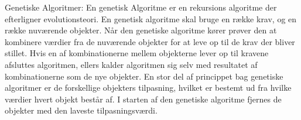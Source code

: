 Genetiske Algoritmer:
En genetisk Algoritme er en rekursions algoritme der efterligner evolutionsteori. En genetisk algoritme skal bruge en række krav, og en række nuværende objekter.
Når den genetiske algoritme kører prøver den at kombinere værdier fra de nuværende objekter for at leve op til de krav der bliver stillet. Hvis en af kombinationerne mellem objekterne lever op til kravene afsluttes algoritmen, ellers kalder algoritmen sig selv med resultatet af kombinationerne som de nye objekter.
En stor del af princippet bag genetiske algoritmer er de forskellige objekters tilpasning, hvilket er bestemt ud fra hvilke værdier hvert objekt består af. I starten af den genetiske algoritme fjernes de objekter med den laveste tilpasningsværdi.